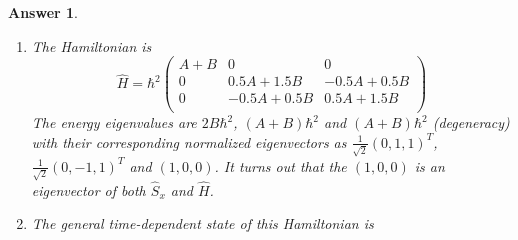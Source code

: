 \documentclass[a4paper]{article}
\newtheorem{ans}{Answer}[subsection]
\theoremstyle{new}
\begin{document}
\begin{ans}
\begin{enumerate}[label=(\roman*)]
The transformed spin matrices must have the familiar form (since they represent spin-1 particles):
$$\hat{S}_z'=\hbar\begin{pmatrix}1&0&0\\0&0&0\\0&0&-1\\\end{pmatrix},\quad\hat{S}_y'=\frac{i\hbar}{\sqrt{2}}\begin{pmatrix}0&-1&0\\1&0&-1\\0&1&0\\\end{pmatrix},\quad\hat{S}_x'=\frac{\hbar}{\sqrt{2}}\begin{pmatrix}0&1&0\\1&0&1\\0&1&0\\\end{pmatrix}$$
To obtain $\hat{S}_y$ and $\hat{S}_z$, we perform the inverse linear transformation and relabel:
$$\hat{S}_y=\mathcal{L}^{-1}\hat{S}_x'=R\hat{S}_x'QP\frac{1}{-i}=\frac{i}{\sqrt{2}}\hbar\begin{pmatrix}0&1&1\\1&0&0\\1&0&0\\\end{pmatrix}$$
$$\hat{S}_z=\mathcal{L}^{-1}\hat{S}_y'=R\hat{S}_y'QP\frac{1}{-i}=\frac{1}{\sqrt{2}}\hbar\begin{pmatrix}0&1&-1\\1&0&0\\-1&0&0\\\end{pmatrix}$$
One can check that the spin matrices do satisfy the commutation relation $[\hat{S}_i,\hat{S}_j]=i\hbar\epsilon_{ijk}\hat{S}_k$.
\item The Hamiltonian is
$$\hat{H}=\hbar^2\begin{pmatrix}A+B&0&0\\0&0.5A+1.5B&-0.5A+0.5B\\0&-0.5A+0.5B&0.5A+1.5B\\\end{pmatrix}$$
The energy eigenvalues are $2B\hbar^2$, $(A+B)\hbar^2$ and $(A+B)\hbar^2$ (degeneracy) with their corresponding normalized eigenvectors as $\frac{1}{\sqrt{2}}(0,1,1)^T$, $\frac{1}{\sqrt{2}}(0,-1,1)^T$ and $(1,0,0)$. It turns out that the $(1,0,0)$ is an eigenvector of both $\hat{S}_x$ and $\hat{H}$.
\item The general time-dependent state of this Hamiltonian is

\end{enumerate}
\end{ans}
\end{document}
